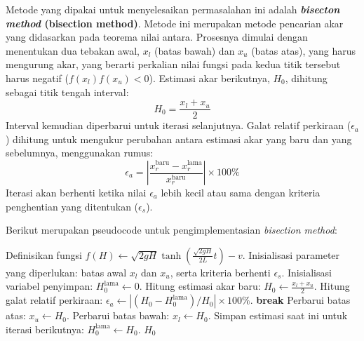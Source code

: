 \documentclass[conference]{IEEEtran}
\begin{document}
Metode yang dipakai untuk menyelesaikan permasalahan ini adalah \textbf{\textit{bisecton method} (bisection method)}. Metode ini merupakan metode pencarian akar yang didasarkan pada teorema nilai antara. Prosesnya dimulai dengan menentukan dua tebakan awal, $x_l$ (batas bawah) dan $x_u$ (batas atas), yang harus mengurung akar, yang berarti perkalian nilai fungsi pada kedua titik tersebut harus negatif ($f(x_l)f(x_u) < 0$). Estimasi akar berikutnya, $H_0$, dihitung sebagai titik tengah interval:
\begin{equation}
    H_0 = \frac{x_l + x_u}{2}
\end{equation}
Interval kemudian diperbarui untuk iterasi selanjutnya. Galat relatif perkiraan ($\epsilon_a$) dihitung untuk mengukur perubahan antara estimasi akar yang baru dan yang sebelumnya, menggunakan rumus:
\begin{equation}
    \epsilon_a = \left|\frac{x_{r}^{\text{baru}} - x_{r}^{\text{lama}}}{x_{r}^{\text{baru}}}\right| \times 100\%
\end{equation} 
Iterasi akan berhenti ketika nilai $\epsilon_a$ lebih kecil atau sama dengan kriteria penghentian yang ditentukan ($\epsilon_s$).

Berikut merupakan pseudocode untuk pengimplementasian \textit{bisection method}:
\begin{flushleft}
\begin{algorithmic}[1]
    \State Definisikan fungsi $f(H) \gets \sqrt{2gH} \tanh\left(\frac{\sqrt{2gH}}{2L}t\right) - v$.
    \State Inisialisasi parameter yang diperlukan: batas awal $x_l$ dan $x_u$, serta kriteria berhenti $\epsilon_s$.
    \State Inisialisasi variabel penyimpan: $H_0^{\text{lama}} \gets 0$.
        \State Hitung estimasi akar baru: $H_0 \gets \frac{x_l + x_u}{2}$.
        \State Hitung galat relatif perkiraan: $\epsilon_a \gets \left| (H_0 - H_0^{\text{lama}}) / H_0 \right| \times 100\%$.
            \State \textbf{break}
        \EndIf
            \State Perbarui batas atas: $x_u \gets H_0$.
        \Else
            \State Perbarui batas bawah: $x_l \gets H_0$.
        \EndIf
        \State Simpan estimasi saat ini untuk iterasi berikutnya: $H_0^{\text{lama}} \gets H_0$.
    \EndWhile
    \State \Return $H_0$
\end{algorithmic}
\end{flushleft}

\clearpage
\end{document}
